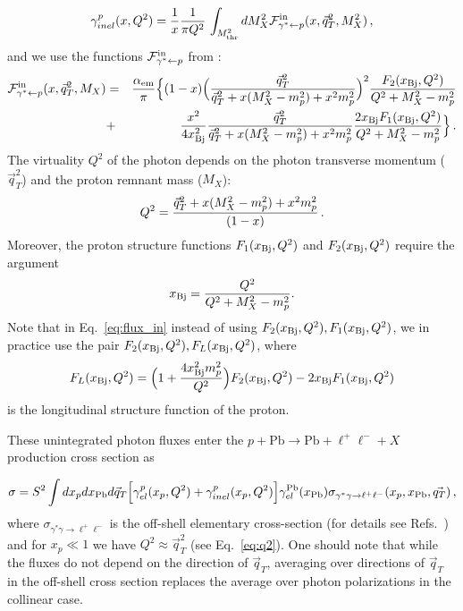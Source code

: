 \begin{eqnarray}
\gamma^p_{inel}(x,Q^2) = {1\over x} 
{1 \over \pi Q^2} \, \int_{M^2_{\rm thr}} dM_X^2 {\cal{F}}^{\mathrm{in}}_{\gamma^* \leftarrow p} (x,\vec{q}_T^2,M^2_X) \, ,
\end{eqnarray}
and we use the functions $ {\cal{F}}^{\mathrm{in}}_{\gamma^* \leftarrow p}$ from \cite{Budnev:1974de, Luszczak:2018ntp}:
\begin{eqnarray}
{\cal{F}}^{\mathrm{in}}_{\gamma^* \leftarrow p} (x,\vec{q}_T^2, M_X) &=& {\alpha_{\rm em} \over \pi} 
\Big\{(1-x) \Big( {\vec{q}_T^2 \over \vec{q}_T^2 + x (M_X^2 - m_p^2) + x^2 m_p^2  }\Big)^2  
{F_2(x_{\rm Bj},Q^2) \over Q^2 + M_X^2 - m_p^2}  \nonumber \\
&+& {x^2 \over 4 x^2_{\rm Bj}}  
{\vec{q}_T^2 \over \vec{q}_T^2 + x (M_X^2 - m_p^2) + x^2 m_p^2  }
{2 x_{\rm Bj} F_1(x_{\rm Bj},Q^2) \over Q^2 + M_X^2 - m_p^2} \Big\} \, .
\label{eq:flux_in}
\end{eqnarray}
The virtuality $Q^2$ of the photon depends on the photon transverse momentum ($\vec{q}_T^2$) and the proton remnant mass ($M_X$):
\begin{eqnarray}
Q^2 =  {\vec{q}_T^2 + x (M_X^2 - m_p^2) + x^2 m_p^2 \over (1-x)} \, .
\label{eq:q2}
\end{eqnarray}
Moreover, the proton structure functions $F_1(x_{\rm Bj},Q^2)$ and $F_2(x_{\rm Bj},Q^2)$ require the argument
\begin{eqnarray}
x_{\rm Bj} = {Q^2 \over Q^2+M^2_X -m_p^2}.
\end{eqnarray}
Note that in Eq.~\ref{eq:flux_in} instead of using $F_2(x_{\rm Bj},Q^2),F_1(x_{\rm Bj},Q^2)$, 
we in practice use the pair $F_2(x_{\rm Bj},Q^2),F_L(x_{\rm Bj},Q^2)$, where
\begin{eqnarray}
F_L(x_{\rm Bj},Q^2) = \Big( 1 + {4 x_{\rm Bj}^2 m_p^2 \over Q^2} \Big) F_2(x_{\rm Bj},Q^2) - 2 x_{\rm Bj} F_1(x_{\rm Bj},Q^2)
\end{eqnarray}
is the longitudinal structure function of the proton.

These unintegrated photon fluxes enter the $p+\textrm{Pb}\rightarrow \textrm{Pb} + \ell^+\ell^- + X$ production cross section as

\begin{equation}
\sigma = S^2 \int dx_p dx_{\rm Pb} d\vec{q}_T \Big[ \gamma^{p}_{el}(x_p, Q^2) + \gamma^{p}_{inel}(x_p,Q^2) \Big]
 \gamma^{\rm Pb}_{el}(x_{\rm Pb})
\sigma_{\gamma^{*}  \gamma \rightarrow \ell^+ \ell^-}(x_p, x_{\rm Pb}, \vec{q_T}) \,,
\label{kt_factorization_formula}
\end{equation}
%
where $\sigma_{\gamma^{*} \gamma \rightarrow \ell^+ \ell^-}$ is the off-shell elementary cross-section (for details see Refs.~\cite{daSilveira:2014jla, Catani:1990eg}) and  for  $x_p \ll 1$ we have $Q^2 \approx \vec{q}_T^2$ (see Eq.~\ref{eq:q2}).
One should note that while the fluxes do not depend on the direction of $\vec{q}_T$, averaging over directions
of $\vec{q}_T$ in the off-shell cross section replaces the average over photon polarizations in the collinear case.
